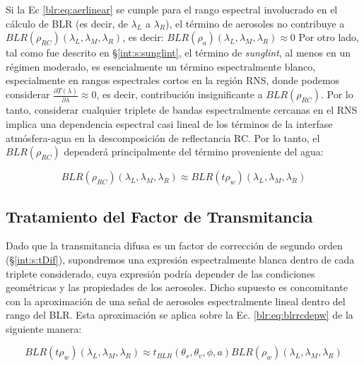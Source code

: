     Si la Ec \ref{blr:eq:aerlinear} se cumple para el rango espectral involucrado en el cálculo de BLR (es decir, de $\lambda_{L}$ a $\lambda_{R}$), el término de aerosoles no contribuye a $BLR(\rho_{RC})(\lambda_{L},\lambda_{M},\lambda_{R}) $, es decir: $ BLR(\rho_{a})(\lambda_{L},\lambda_{M},\lambda_{R})\approx 0$
    Por otro lado, tal como fue descrito en \S \ref{int:s:sunglint}, el término de \textit{sunglint}, al menos en un régimen moderado, es esencialmente un término espectralmente blanco, especialmente en rangos espectrales cortos en la región RNS, donde podemos considerar $\frac{\partial T(\lambda)}{\partial\lambda }\approx0$, es decir, contribución insignificante a $BLR(\rho_{RC})$. Por lo tanto, considerar cualquier triplete de bandas espectralmente cercanas en el RNS implica una dependencia espectral casi lineal de los términos de la interfase atmósfera-agua en la descomposición de reflectancia RC. Por lo tanto, el $BLR(\rho_{RC})$ dependerá principalmente del término proveniente del agua:
    
    \begin{equation}
        BLR(\rho_{RC})(\lambda_{L},\lambda_{M},\lambda_{R})\approx BLR(t\rho_{w})(\lambda_{L},\lambda_{M},\lambda_{R})
        \label{blr:eq:blrrcdepw}
    \end{equation}

    \subsection{Tratamiento del Factor de Transmitancia}
    \label{blr:s:transmittance}

        Dado que la transmitancia difusa es un factor de corrección de segundo orden (\S \ref{int:s:tDif}), supondremos una expresión espectralmente blanca dentro de cada triplete considerado, cuya expresión podría depender de las condiciones geométricas y las propiedades de los aerosoles. Dicho supuesto es concomitante con la aproximación de una señal de aerosoles espectralmente lineal dentro del rango del BLR. Esta aproximación se aplica sobre la Ec. \ref{blr:eq:blrrcdepw} de la siguiente manera:
        
        \begin{equation}
            BLR(t\rho_{w})(\lambda_{L},\lambda_{M},\lambda_{R}) \approx t_{BLR}(\theta_{s},\theta_{v},\phi,a)BLR(\rho_{w})(\lambda_{L},\lambda_{M},\lambda_{R})
            \label{blr:eq:blrtfactor}
        \end{equation}
        
